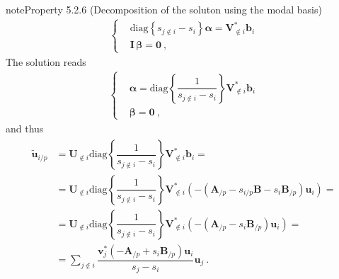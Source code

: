 \documentclass[letterpaper,10pt,english]{jupyterBook}
\begin{document}
\begin{sphinxadmonition}{note}{Property 5.2.6 (Decomposition of the soluton using the modal basis)}
\begin{equation*}
\begin{split}\left\{ \begin{aligned}
 &  \text{diag} \left\{ s_{j \notin i} - s_i \right\} \boldsymbol\alpha = \mathbf{V}_{\notin i}^* \mathbf{b}_i \\
 &  \mathbf{I} \, \boldsymbol{\beta} = \mathbf{0} \ ,
\end{aligned}\right.\end{split}
\end{equation*}
\sphinxAtStartPar
The solution reads
\begin{equation*}
\begin{split}\left\{ \begin{aligned}
 & \boldsymbol\alpha = \text{diag} \left\{ \dfrac{1}{ s_{j \notin i} - s_i } \right\} \mathbf{V}_{\notin i}^* \mathbf{b}_i \\
 & \boldsymbol{\beta} = \mathbf{0} \ ,
\end{aligned}\right.\end{split}
\end{equation*}
\sphinxAtStartPar
and thus
\begin{equation*}
\begin{split}\begin{aligned}
  \widetilde{\mathbf{u}}_{i/p}
  & = \mathbf{U}_{\notin i} \text{diag} \left\{ \dfrac{1}{ s_{j \notin i} - s_i } \right\} \mathbf{V}_{\notin i}^* \mathbf{b}_i  = \\
  & = \mathbf{U}_{\notin i} \text{diag} \left\{ \dfrac{1}{ s_{j \notin i} - s_i } \right\} \mathbf{V}_{\notin i}^* (- ( \mathbf{A}_{/p} - s_{i/p} \mathbf{B} - s_i \mathbf{B}_{/p}) \mathbf{u}_i)  = \\
  & = \mathbf{U}_{\notin i} \text{diag} \left\{ \dfrac{1}{ s_{j \notin i} - s_i } \right\} \mathbf{V}_{\notin i}^* (- ( \mathbf{A}_{/p} - s_i \mathbf{B}_{/p}) \mathbf{u}_i)  = \\
  & = \sum_{j \notin i} \dfrac{ \mathbf{v}_{j}^* ( - \mathbf{A}_{/p} + s_i \mathbf{B}_{/p}) \mathbf{u}_i }{ s_{j} - s_i } \mathbf{u}_{j} \ .
\end{aligned}\end{split}
\end{equation*}\end{sphinxadmonition}
\end{document}
